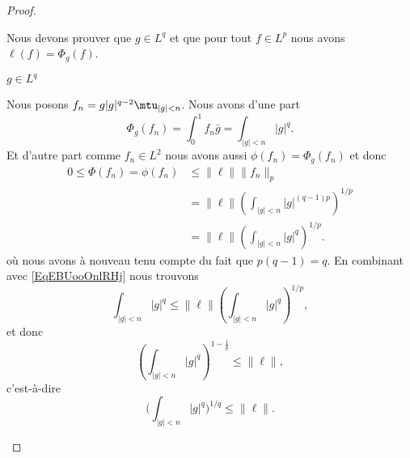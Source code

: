 \begin{proof}
\begin{subproof}
\begin{subproof}
                    Nous devons prouver que \( g\in L^q\) et que pour tout \( f\in L^p\) nous avons \( \ell(f)=\Phi_g(f)\).

                \item[\( g\in L^q\)]

                    Nous posons \( f_n=g| g |^{q-2}\mtu_{| g |<n}\). Nous avons d'une part
                    \begin{equation}    \label{EqEBUooOnlRHj}
                        \Phi_g(f_n)=\int_0^1f_n\bar g=\int_{| g |<n}| g |^q.
                    \end{equation}
                    Et d'autre part comme \( f_n\in L^2\) nous avons aussi \( \phi(f_n)=\Phi_g(f_n)\) et donc
                    \begin{subequations}
                        \begin{align}
                            0\leq \Phi(f_n)= \phi(f_n)&\leq \| \ell \|\| f_n \|_p\\
                            &=\| \ell \|\left( \int_{| g |<n}| g |^{(q-1)p} \right)^{1/p}\\
                            &=\| \ell \|\left( \int_{| g |<n}| g |^q \right)^{1/p}.
                        \end{align}
                    \end{subequations}
                    où nous avons à nouveau tenu compte du fait que \( p(q-1)=q\). En combinant avec \eqref{EqEBUooOnlRHj} nous trouvons
                    \begin{equation}
                        \int_{| g |<n}| g |^q\leq \| \ell \|\left( \int_{| g |<n}| g |^q \right)^{1/p},
                    \end{equation}
                    et donc
                    \begin{equation}
                        \left( \int_{| g |<n}| g |^{q} \right)^{1-\frac{1}{ p }}\leq \| \ell \|,
                    \end{equation}
                    c'est-à-dire
                    \begin{equation}
                        \Big( \int_{| g |<n}| g |^q \Big)^{1/q}\leq \| \ell \|.
                    \end{equation}


\end{subproof}
\end{subproof}
\end{proof}
